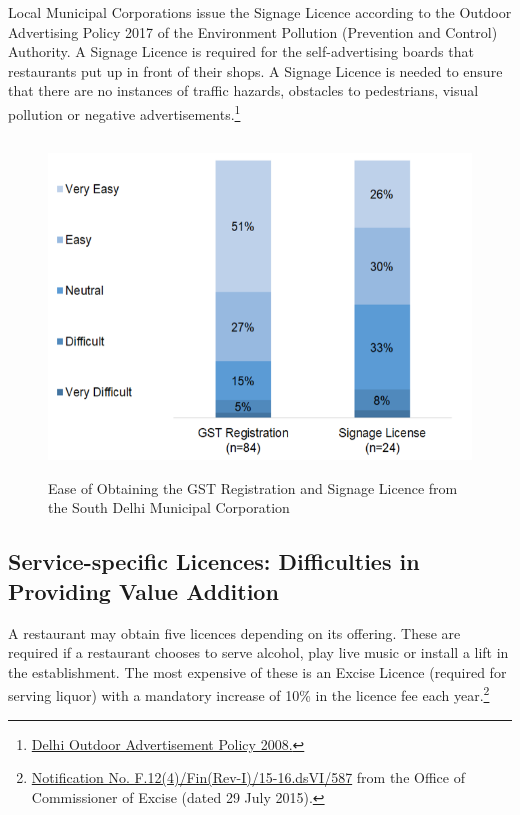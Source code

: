 \documentclass[a4paper, 12pt, twoside]{article}
\begin{document}
		Local Municipal Corporations issue the Signage Licence according to the Outdoor Advertising Policy 2017 of the Environment Pollution (Prevention and Control) Authority. A Signage Licence is required for the self-advertising boards that restaurants put 
up in front of their shops. A Signage Licence is needed to ensure that there are no instances of traffic hazards, obstacles to pedestrians, visual pollution or negative advertisements.\footnote{\href{https://bit.ly/2xdiNzk}{Delhi Outdoor Advertisement Policy 2008.}}
		
		\begin{figure}[H]
                    	\centering
                    	\includegraphics[height = 3.5in]{Figure3.png}
                    	\captionsetup{justification=centering}\caption[Optional Caption]{Ease of Obtaining the GST Registration and Signage Licence from the South Delhi Municipal Corporation}
		\end{figure}
		
		\subsection{Service-specific Licences: Difficulties in Providing Value Addition}
		
		A restaurant may obtain five licences depending on its offering. These are required if a restaurant chooses to serve alcohol, play live music or install a lift in the establishment. The most expensive of these is an Excise Licence (required for serving liquor) 
with a mandatory increase of 10\% in the licence fee each year.\footnote{\href{https://bit.ly/2xoejoG}{Notification No. F.12(4)/Fin(Rev-I)/15-16.dsVI/587} from the Office of Commissioner of Excise (dated 29 July 2015).}
\end{document}
